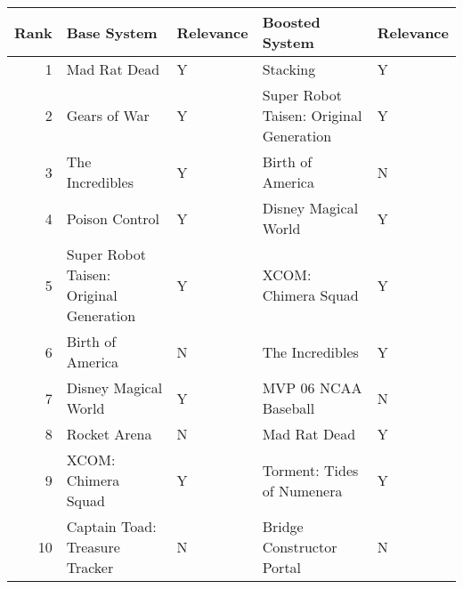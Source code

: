 \begin{tabular}{rllll}
\toprule
 Rank &                             Base System & Relevance &                          Boosted System & Relevance \\
\midrule
    1 &                            Mad Rat Dead &         Y &                                Stacking &         Y \\
    2 &                            Gears of War &         Y & Super Robot Taisen: Original Generation &         Y \\
    3 &                         The Incredibles &         Y &                        Birth of America &         N \\
    4 &                          Poison Control &         Y &                    Disney Magical World &         Y \\
    5 & Super Robot Taisen: Original Generation &         Y &                     XCOM: Chimera Squad &         Y \\
    6 &                        Birth of America &         N &                         The Incredibles &         Y \\
    7 &                    Disney Magical World &         Y &                    MVP 06 NCAA Baseball &         N \\
    8 &                            Rocket Arena &         N &                            Mad Rat Dead &         Y \\
    9 &                     XCOM: Chimera Squad &         Y &              Torment: Tides of Numenera &         Y \\
   10 &          Captain Toad: Treasure Tracker &         N &               Bridge Constructor Portal &         N \\
\bottomrule
\end{tabular}
